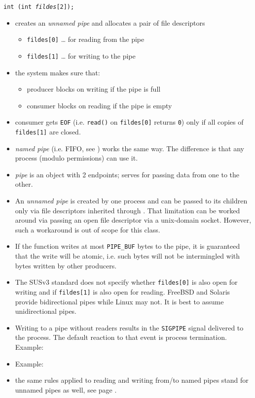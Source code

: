 \begin{slide}
\texttt{int (int \emph{fildes}[2]);}
\begin{itemize}
\item creates an \emph{unnamed pipe} and allocates a pair of file descriptors
    \begin{itemize}
    \item \texttt{fildes[0]} \dots{} for reading from the pipe
    \item \texttt{fildes[1]} \dots{} for writing to the pipe
    \end{itemize}
\item the system makes sure that:
    \begin{itemize}
    \item producer blocks on writing if the pipe is full
    \item consumer blocks on reading if the pipe is empty
    \end{itemize}
\item consumer gets \texttt{EOF} (i.e. \texttt{read()} on \texttt{fildes[0]}
returns \texttt{0}) only if all copies of \texttt{fildes[1]} are closed.
\item \emph{named pipe} (i.e. FIFO, see ) works the same way.
The difference is that any process (modulo permissions) can use it.
\end{itemize}
\end{slide}

\label{PIPE}

\begin{itemize}
\item \emph{pipe} is an object with 2 endpoints; serves for passing data from
one to the other.
\item An \emph{unnamed pipe} is created by one process and can be passed to its
children only via file descriptors inherited through .  That
limitation can be worked around via passing an open file descriptor via a
u{}nix-domain socket.  However, such a workaround is out of scope for this
class.
\item If the function  writes at most \texttt{PIPE\_BUF} bytes to
the pipe, it is guaranteed that the write will be atomic, i.e. such bytes will
not be intermingled with bytes written by other producers.
\item \label{TWO_WAY_PIPES} The SUSv3 standard does not specify whether
\texttt{fildes[0]} is also open for writing and if \texttt{fildes[1]} is also
open for reading.  FreeBSD and Solaris provide bidirectional pipes while Linux
may not.  It is best to assume unidirectional pipes.
\item Writing to a pipe without readers results in the \texttt{SIGPIPE} signal
delivered to the process. The default reaction to that event is process
termination. Example: 
\item Example: 
\item {} the same rules applied to reading and writing from/to
named pipes stand for unnamed pipes as well, see page \pageref{NAMEDPIPE}.
\end{itemize}

